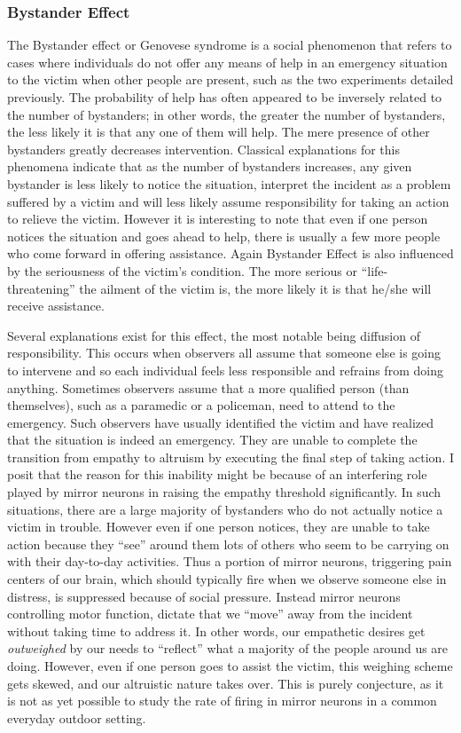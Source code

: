 \documentclass[12pt, letter]{article}
\begin{document}
\subsubsection*{Bystander Effect}
The Bystander effect or Genovese syndrome is a social phenomenon that refers to cases where individuals do not offer any means of help in an emergency situation to the victim when other people are present, such as the two experiments detailed previously. The probability of help has often appeared to be inversely related to the number of bystanders; in other words, the greater the number of bystanders, the less likely it is that any one of them will help. The mere presence of other bystanders greatly decreases intervention. Classical explanations for this phenomena indicate that as the number of bystanders increases, any given bystander is less likely to notice the situation, interpret the incident as a problem suffered by a victim and will less likely assume responsibility for taking an action to relieve the victim. However it is interesting to note that even if one person notices the situation and goes ahead to help, there is usually a few more people who come forward in offering assistance. Again Bystander Effect is also influenced by the seriousness of the victim's condition. The more serious or ``life-threatening'' the ailment of the victim is, the more likely it is that he/she will receive assistance.

Several explanations exist for this effect, the most notable being diffusion of responsibility. This occurs when observers all assume that someone else is going to intervene and so each individual feels less responsible and refrains from doing anything. Sometimes observers assume that a more qualified person (than themselves), such as a paramedic or a policeman, need to attend to the emergency. Such observers have usually identified the victim and have realized that the situation is indeed an emergency. They are unable to complete the transition from empathy to altruism by executing the final step of taking action. I posit that the reason for this inability might be because of an interfering role played by mirror neurons in raising the empathy threshold significantly. In such situations, there are a large majority of bystanders who do not actually notice a victim in trouble. However even if one person notices, they are unable to take action because they ``see'' around them lots of others who seem to be carrying on with their day-to-day activities. Thus a portion of mirror neurons, triggering pain centers of our brain, which should typically fire when we observe someone else in distress, is suppressed because of social pressure. Instead mirror neurons controlling motor function, dictate that we ``move'' away from the incident without taking time to address it. In other words, our empathetic desires get \emph{outweighed} by our needs to ``reflect'' what a majority of the people around us are doing. However, even if one person goes to assist the victim, this weighing scheme gets skewed, and our altruistic nature takes over. This is purely conjecture, as it is not as yet possible to study the rate of firing in mirror neurons in a common everyday outdoor setting.
\end{document}
